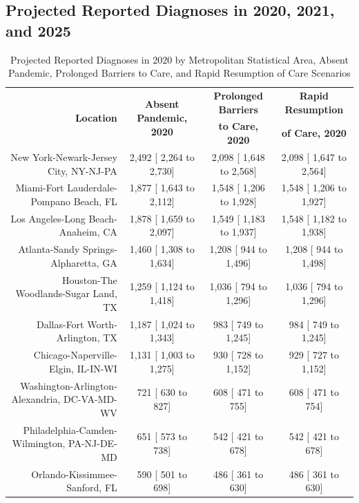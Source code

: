 \documentclass{article}
\begin{document}

\subsection{Projected Reported Diagnoses in 2020, 2021, and 2025}

\begin{table}[H]
	\caption{Projected Reported Diagnoses in 2020 by Metropolitan Statistical Area, Absent Pandemic, Prolonged Barriers to Care, and Rapid Resumption of Care Scenarios}
	\footnotesize
	\begin{tabular}{|r|c|c|c|}
		\hline
		\multirow{2}{*}{\textbf{Location}} & \multirow{2}{*}{\textbf{Absent Pandemic, 2020}} & \textbf{Prolonged Barriers} & \textbf{Rapid Resumption}\\
		&  & \textbf{to Care, 2020} & \textbf{of Care, 2020}\\
		\hline\hline
		New York-Newark-Jersey City, NY-NJ-PA &  2,492 [ 2,264 to  2,730] &  2,098 [ 1,648 to  2,568] &  2,098 [ 1,647 to  2,564]\\
		Miami-Fort Lauderdale-Pompano Beach, FL &  1,877 [ 1,643 to  2,112] &  1,548 [ 1,206 to  1,928] &  1,548 [ 1,206 to  1,927]\\
		Los Angeles-Long Beach-Anaheim, CA &  1,878 [ 1,659 to  2,097] &  1,549 [ 1,183 to  1,937] &  1,548 [ 1,182 to  1,938]\\
		Atlanta-Sandy Springs-Alpharetta, GA &  1,460 [ 1,308 to  1,634] &  1,208 [   944 to  1,496] &  1,208 [   944 to  1,498]\\
		Houston-The Woodlands-Sugar Land, TX &  1,259 [ 1,124 to  1,418] &  1,036 [   794 to  1,296] &  1,036 [   794 to  1,296]\\
		Dallas-Fort Worth-Arlington, TX &  1,187 [ 1,024 to  1,343] &    983 [   749 to  1,245] &    984 [   749 to  1,245]\\
		Chicago-Naperville-Elgin, IL-IN-WI &  1,131 [ 1,003 to  1,275] &    930 [   728 to  1,152] &    929 [   727 to  1,152]\\
		Washington-Arlington-Alexandria, DC-VA-MD-WV &    721 [   630 to    827] &    608 [   471 to    755] &    608 [   471 to    754]\\
		Philadelphia-Camden-Wilmington, PA-NJ-DE-MD &    651 [   573 to    738] &    542 [   421 to    678] &    542 [   421 to    678]\\
		Orlando-Kissimmee-Sanford, FL &    590 [   501 to    698] &    486 [   361 to    630] &    486 [   361 to    630]\\

\end{tabular}
\end{table}
\end{document}
